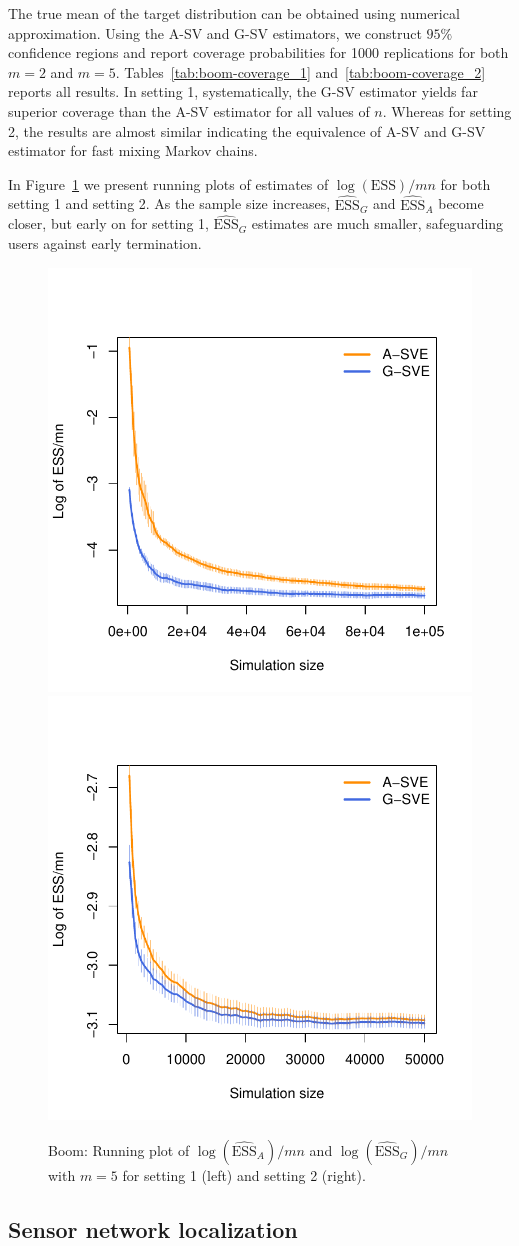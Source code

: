 \documentclass[12pt]{article}
\theoremstyle{remark}
\begin{document}
The true mean of the target distribution can be obtained using numerical approximation. Using  the A-SV and G-SV estimators, we construct $95\%$ confidence regions and report coverage probabilities for 1000 replications for both $m=2$ and $m=5$. Tables~\ref{tab:boom-coverage_1} and~\ref{tab:boom-coverage_2} reports all  results. In setting 1, systematically, the G-SV estimator yields far superior coverage than the A-SV estimator for all values of $n$. Whereas for setting 2, the results are almost similar indicating the equivalence of A-SV and G-SV estimator for fast mixing Markov chains.

In Figure~\ref{fig:boom-ess} we present running plots of estimates of $\log(\textrm{ESS})/mn$ for both setting 1 and setting 2. As the sample size increases, $\widehat{\text{ESS}}_G$ and  $\widehat{\text{ESS}}_A$ become closer, but early on for setting 1, $\widehat{\text{ESS}}_G$ estimates are much smaller, safeguarding users against early termination.

\begin{figure}[htbp]
    \centering
      \includegraphics[width = .30\textwidth]{plots/boom-ess_1_3_8_m5.pdf}
      \includegraphics[width = .30\textwidth]{plots/boom-ess_1_10_7_m5.pdf}          

    \caption{Boom: Running plot of $\log (\widehat{\text{ESS}}_A )/mn$ and $\log (\widehat{\text{ESS}}_G )/mn$ with $m = 5$ for setting 1 (left) and setting 2 (right).}
    \label{fig:boom-ess}
\end{figure}




\subsection{Sensor network localization}
\end{document}

